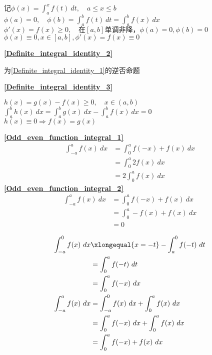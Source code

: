\begin{center}
	\mbox{记}$\phi (x)=\int_{a}^{x}f(t)\ dt,\quad a\leqslant x\leqslant b$\\
	$\phi(a)= 0,\quad \phi(b)=\int_{a}^{b}f(t)\ dt=\int_{a}^{b}f(x)\ dx$\\
	$\phi'(x)=f(x)\geqslant 0,\quad \mbox{在}\left[a,b\right]\mbox{单调非降}，\phi(a)=0,\phi(b)=0$\\
	$\phi(x)\equiv 0,x\in\left[a,b\right],\phi'(x)=f(x)\equiv 0$
\end{center}
\textbf{\large \ref{Definite_integral_identity_2}}
\begin{center}
	为\ref{Definite_integral_identity_1}的逆否命题
\end{center} 
\textbf{\large \ref{Definite_integral_identity_3}}
\begin{center}
	$h(x)=g(x)-f(x)\geqslant 0,\quad x\in(a,b)$\\
	$\int_{a}^{b}h(x)\ dx=\int_{a}^{b}g(x)\ dx-\int_{a}^{b}f(x)\ dx=0$\\
	$h(x)\equiv 0\Rightarrow f(x)=g(x)$
\end{center}
\begin{minipage}{.4\textwidth}
	\textbf{\large \ref{Odd_even_function_integral_1}}\\
	\begin{align*}
	\int_{-a}^{a}f(x)\ dx&=\int_{0}^{a}f(-x)+f(x)\ dx\\
	&=\int_{0}^{a}2f(x)\ dx\\
	&=2\int_{0}^{a}f(x)\ dx
	\end{align*}
	\textbf{\large \ref{Odd_even_function_integral_2}}\\
	\begin{align*}
		\int_{-a}^{a}f(x)\ dx&=\int_{0}^{a}f(-x)+f(x)\ dx\\
		&=\int_{0}^{a}-f(x)+f(x)\ dx\\
		&=0
	\end{align*}
\end{minipage}
\hfill
\hspace{0.5mm}
\vline
\hspace{0.5mm}
\begin{minipage}{.4\textwidth}
	\begin{align*}
		\int_{-a}^{0}f(x)\ dx&\xlongequal{x=-t}-\int_{a}^{0}f(-t)\ dt\\
		&=\int_{0}^{a}f(-t)\ dt\\
		&=\int_{0}^{a}f(-x)\ dx\\
\int_{-a}^{a}f(x)\ dx&=\int_{-a}^{0}f(x)\ dx+\int_{0}^{a}f(x)\ dx\\
&=\int_{0}^{a}f(-x)\ dx+\int_{0}^{a}f(x)\ dx\\
&=\int_{0}^{a}f(-x)+f(x)\ dx
	\end{align*}
\end{minipage}
